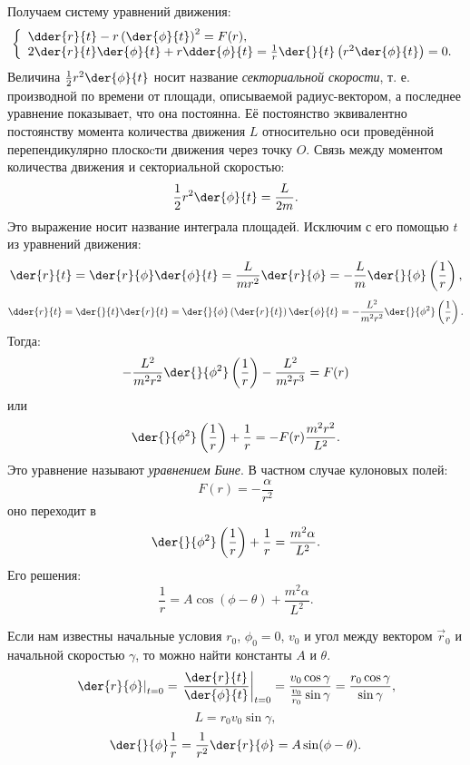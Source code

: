 Получаем систему уравнений движения:
\[
    \left\{
    \begin{array}{l}
        \dder{r}{t} - 
        r
        \left(
        \der{\phi}{t}
        \right)^2 = 
        F(r),
        \\ 
        2\der{r}{t} \der{\phi}{t}+ 
        r \dder{\phi}{t}
        =
        \frac{1}{r}
        \der{}{t}
        \left(
            r^2 \der{\phi}{t}
        \right)
        = 0.
    \end{array}
    \right.
\]
Величина \( \frac{1}{2}r^2 \der{\phi}{t} \) носит название
\textit{секториальной скорости}, т. е. производной по времени от площади,
описываемой радиус-вектором, а последнее уравнение показывает, что она
постоянна. Её постоянство эквивалентно постоянству момента количества движения
\( L \) относительно оси проведённой перепендикулярно плоскоcти движения через
точку \( O \). Связь между моментом количества движения и секториальной
скоростью:
\[
    \frac{1}{2}r^2 \der{\phi}{t} = \frac{L}{2m}.
\]
Это выражение носит название интеграла площадей. Исключим с его помощью \( t \)
из уравнений движения:
\[
    \der{r}{t} = 
    \der{r}{\phi} \der{\phi}{t} =
    \frac{L}{mr^2 } \der{r}{\phi} =
    -\frac{L}{m} \der{}{\phi}\left( \frac{1}{r} \right),
\]   
\[
    \dder{r}{t} = 
    \der{}{t}\der{r}{t}  =
    \der{}{\phi}\left(\der{r}{t}\right)\der{\phi}{t} =
    -\frac{L^2}{m^2 r^2 } \der{}{\phi^2}\left( \frac{1}{r} \right).
\]     
Тогда:
\[
    -\frac{L^2}{m^2 r^2 } \der{}{\phi^2}\left( \frac{1}{r} \right) -
    \frac{L^2}{m^2 r^3} = 
    F(r)
\]   
или
\[
    \der{}{\phi^2}\left( \frac{1}{r} \right) +
    \frac{1}{r} = 
    - F(r)\frac{m^2 r^2}{ L^2}.
\]   
Это уравнение называют \textit{уравнением Бине}. В частном случае кулоновых
полей:
\[
    F(r) = -\frac{\alpha}{r^2}
\]   
оно переходит в
\[
    \der{}{\phi^2}\left( \frac{1}{r} \right) +
        \frac{1}{r} = 
        \frac{m^2 \alpha}{ L^2}.
\]     
Его решения:
\[
    \frac{1}{r} = A \cos (\phi - \theta) + \frac{m^2 \alpha}{ L^2}.
\]   
    
Если нам известны начальные условия \( r_0 \), \( \phi_0 = 0 \), \( v_0 \)
и угол между вектором \( \vec{r}_{0} \) и начальной скоростью \( \gamma \), то
можно найти константы \( A \) и \( \theta \).
\[
    \left.\der{r}{\phi}\right|_{t=0} = 
    \left.\frac{\der{r}{t}}{\der{\phi}{t}}\right|_{t=0} =
    \frac{ v_0 \cos \gamma}{\frac{v_0}{r_0}  \sin \gamma} =
    \frac{ r_0 \cos \gamma}{ \sin \gamma},
\]
\[   
    L = r_0 v_0 \sin \gamma,
\]
\[   
    \der{}{\phi}\frac{1}{r} = \frac{1}{r^2} \der{r}{\phi} =
    A \sin (\phi - \theta).
\]
    
